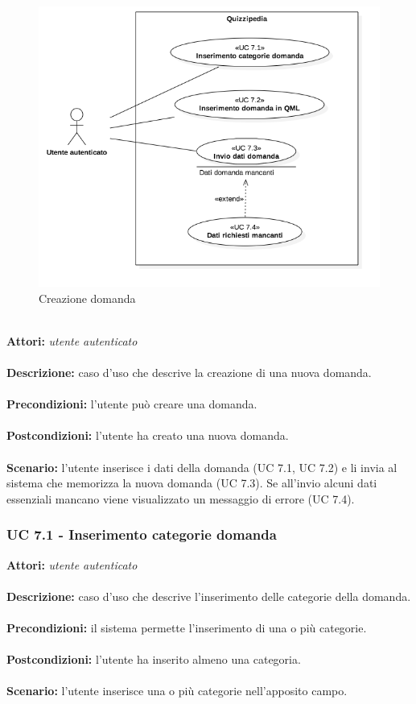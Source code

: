 \documentclass[a4paper,11pt]{article}
\begin{document}
\begin{figure}[h!]
\centering
\includegraphics[scale=0.6]{../immagini/UC7.png}
\caption{Creazione domanda}
\end{figure}
\ \\
\textbf{Attori:} \textit{utente autenticato}
\\ \\
\textbf{Descrizione:} caso d'uso che descrive la creazione di una nuova domanda.\\
\\
\textbf{Precondizioni:} l'utente può creare una domanda.\\
\\
\textbf{Postcondizioni:} l’utente ha creato una nuova domanda.\\
\\
\textbf{Scenario:} l’utente inserisce i dati della domanda (UC 7.1, UC 7.2) e li invia al sistema che memorizza la nuova domanda (UC 7.3). Se all'invio alcuni dati essenziali mancano viene visualizzato un messaggio di errore (UC 7.4).\\


\subsubsection{UC 7.1 - Inserimento categorie domanda}

\textbf{Attori:} \textit{utente autenticato}
\\ \\
\textbf{Descrizione:} caso d'uso che descrive l'inserimento delle categorie della domanda.\\
\\
\textbf{Precondizioni:} il sistema permette l'inserimento di una o più categorie.\\
\\
\textbf{Postcondizioni:} l’utente ha inserito almeno una categoria.\\
\\
\textbf{Scenario:} l’utente inserisce una o più categorie nell'apposito campo.\\
\end{document}
